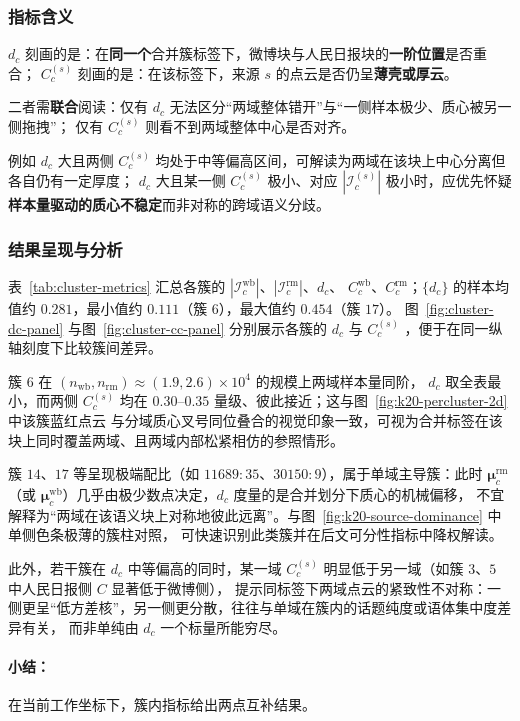 \documentclass[withoutpreface]{cumcmthesis}
\begin{document}
\subsubsection{指标含义}
$d_c$ 刻画的是：在\textbf{同一个}合并簇标签下，微博块与人民日报块的\textbf{一阶位置}是否重合；
$C_c^{(s)}$ 刻画的是：在该标签下，来源 $s$ 的点云是否仍呈\textbf{薄壳或厚云}。

二者需\textbf{联合}阅读：仅有 $d_c$ 无法区分“两域整体错开”与“一侧样本极少、质心被另一侧拖拽”；
仅有 $C_c^{(s)}$ 则看不到两域整体中心是否对齐。

例如 $d_c$ 大且两侧 $C_c^{(s)}$ 均处于中等偏高区间，可解读为两域在该块上中心分离但各自仍有一定厚度；
$d_c$ 大且某一侧 $C_c^{(s)}$ 极小、对应 $|\mathcal{I}^{(s)}_c|$ 极小时，应优先怀疑\textbf{样本量驱动的质心不稳定}而非对称的跨域语义分歧。

\subsubsection{结果呈现与分析}
表~\ref{tab:cluster-metrics} 汇总各簇的 $|\mathcal{I}^{\mathrm{wb}}_c|$、$|\mathcal{I}^{\mathrm{rm}}_c|$、$d_c$、
$C_c^{\mathrm{wb}}$、$C_c^{\mathrm{rm}}$；$\{d_c\}$ 的样本均值约 $0.281$，最小值约 $0.111$（簇 $6$），最大值约 $0.454$（簇 $17$）。
图~\ref{fig:cluster-dc-panel} 与图~\ref{fig:cluster-cc-panel} 分别展示各簇的 $d_c$ 与 $C_c^{(s)}$ ，便于在同一纵轴刻度下比较簇间差异。

簇 $6$ 在 $(n_{\mathrm{wb}},n_{\mathrm{rm}})\approx(1.9,2.6)\times 10^4$ 的规模上两域样本量同阶，
$d_c$ 取全表最小，而两侧 $C_c^{(s)}$ 均在 $0.30$--$0.35$ 量级、彼此接近；这与图~\ref{fig:k20-percluster-2d} 中该簇蓝红点云
与分域质心叉号同位叠合的视觉印象一致，可视为合并标签在该块上同时覆盖两域、且两域内部松紧相仿的参照情形。

簇 $14$、$17$ 等呈现极端配比（如 $11689:35$、$30150:9$），属于单域主导簇：此时 $\boldsymbol{\mu}^{\mathrm{rm}}_c$
（或 $\boldsymbol{\mu}^{\mathrm{wb}}_c$）几乎由极少数点决定，$d_c$ 度量的是合并划分下质心的机械偏移，
不宜解释为“两域在该语义块上对称地彼此远离”。与图~\ref{fig:k20-source-dominance} 中单侧色条极薄的簇柱对照，
可快速识别此类簇并在后文可分性指标中降权解读。

此外，若干簇在 $d_c$ 中等偏高的同时，某一域 $C_c^{(s)}$ 明显低于另一域（如簇 $3$、$5$ 中人民日报侧 $C$ 显著低于微博侧），
提示同标签下两域点云的紧致性不对称：一侧更呈“低方差核”，另一侧更分散，往往与单域在簇内的话题纯度或语体集中度差异有关，
而非单纯由 $d_c$ 一个标量所能穷尽。

\paragraph{小结：} 在当前工作坐标下，簇内指标给出两点互补结果。
\end{document}
